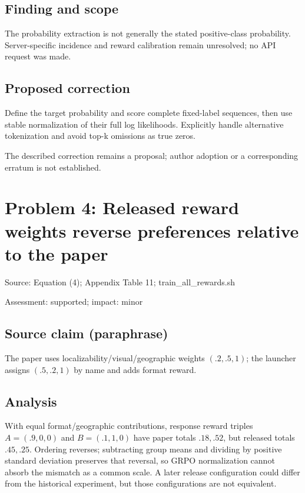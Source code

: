 \documentclass[11pt]{article}
\begin{document}
\subsection*{Finding and scope}

The probability extraction is not generally the stated positive-class probability. Server-specific incidence and reward calibration remain unresolved; no API request was made.

\subsection*{Proposed correction}

Define the target probability and score complete fixed-label sequences, then use stable normalization of their full log likelihoods. Explicitly handle alternative tokenization and avoid top-k omissions as true zeros.

The described correction remains a proposal; author adoption or a corresponding erratum is not established.

\section*{Problem 4: Released reward weights reverse preferences relative to the paper}

Source: Equation (4); Appendix Table 11; train\_all\_rewards.sh

Assessment: supported; impact: minor

\subsection*{Source claim (paraphrase)}

The paper uses localizability/visual/geographic weights \((.2,.5,1)\); the launcher assigns \((.5,.2,1)\) by name and adds format reward.

\subsection*{Analysis}

With equal format/geographic contributions, response reward triples \(A=(.9,0,0)\) and \(B=(.1,1,0)\) have paper totals \(.18,.52\), but released totals \(.45,.25\). Ordering reverses; subtracting group means and dividing by positive standard deviation preserves that reversal, so GRPO normalization cannot absorb the mismatch as a common scale. A later release configuration could differ from the historical experiment, but those configurations are not equivalent.
\end{document}
